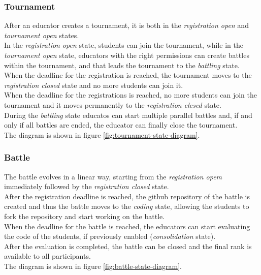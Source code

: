 \subsubsection*{Tournament}
After an educator creates a tournament, it is both in the \textit{registration open} and \textit{tournament open} states.\\
In the \textit{registration open} state, students can join the tournament, while in the \textit{tournament open} state, educators with the right permissions can create battles within the tournament, and that leads the tournament to the \textit{battling} state.\\
When the deadline for the registration is reached, the tournament moves to the \textit{registration closed} state and no more students can join it.\\
When the deadline for the registrations is reached, no more students can join the tournament and it moves permanently to the \textit{registration clcsed} state.\\
During the \textit{battling} state educatos can start multiple parallel battles and, if and only if all battles are ended, the educator can finally close the tournament.\\
The diagram is shown in figure \ref{fig:tournament-state-diagram}.\\

\subsubsection*{Battle}
The battle evolves in a linear way, starting from the \textit{registration opem} immediately followed by the \textit{registration closed} state.\\
After the registration deadline is reached, the github repository of the battle is created and thus the battle moves to the \textit{coding} state, allowing the students to fork the repository and start working on the battle.\\
When the deadline for the battle is reached, the educators can start evaluating the code of the students, if previously enabled (\textit{consolidation} state). \\
After the evaluation is completed, the battle can be closed and the final rank is available to all participants.\\
The diagram is shown in figure \ref{fig:battle-state-diagram}.\\

